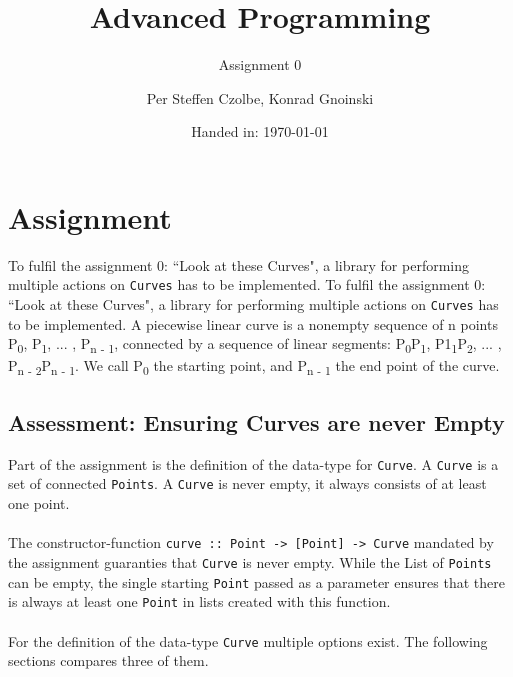 \documentclass[11pt, a4paper]{article}
\author{Per Steffen Czolbe, Konrad Gnoinski}
\title{Advanced Programming}
\subtitle{Assignment 0} %
\date{Handed in: \today}
\begin{document}
\maketitle

\tableofcontents

\section{Assignment}
To fulfil the assignment 0: ``Look at these Curves", a library for performing multiple actions on \texttt{Curves} has to be implemented. To fulfil the assignment 0: ``Look at these Curves", a library for performing multiple actions on \texttt{Curves} has to be implemented. A piecewise linear curve is a nonempty sequence of n points P\textsubscript{0}, P\textsubscript{1}, ... , P\textsubscript{n - 1}, connected by a sequence of linear segments: P\textsubscript{0}P\textsubscript{1}, P1\textsubscript{1}P\textsubscript{2}, ... , P\textsubscript{n - 2}P\textsubscript{n - 1}. We call P\textsubscript{0} the starting point, and P\textsubscript{n - 1} the end point of the curve.

\subsection{Assessment: Ensuring Curves are never Empty}
Part of the assignment is the definition of the data-type for \texttt{Curve}. A \texttt{Curve} is a set of connected \texttt{Points}. A \texttt{Curve} is never empty, it always consists of at least one point.
 
\paragraph{}
The constructor-function \texttt{curve :: Point -> [Point] -> Curve} mandated by the assignment guaranties that \texttt{Curve} is never empty. While the List of \texttt{Points} can be empty, the single starting \texttt{Point} passed as a parameter ensures that there is always at least one \texttt{Point} in lists created with this function.

\paragraph{}
For the definition of the data-type \texttt{Curve} multiple options exist. The following sections compares three of them.
\end{document}
